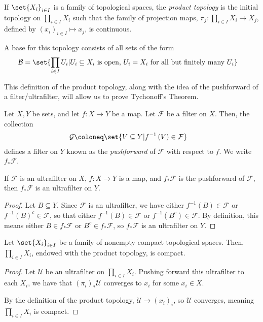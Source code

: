 \documentclass[10pt]{mypackage}
\begin{document}
\begin{definition}
  If $\set{X_i}_{i\in I}$ is a family of topological spaces, the \textit{product topology} is the initial topology on $\prod_{i\in I}X_i$ such that the family of projection maps, $\pi_j\colon \prod_{i\in I}X_i\rightarrow X_j$, defined by $\left( x_i \right)_{i\in I} \mapsto x_j$, is continuous.\newline

  A base for this topology consists of all sets of the form
  \begin{align*}
    \mathcal{B} &= \set{\prod_{i\in I}U_{i} | U_i\subseteq X_i\text{ is open, }U_i = X_i\text{ for all but finitely many }U_i}
  \end{align*}
\end{definition}
This definition of the product topology, along with the idea of the pushforward of a filter/ultrafilter, will allow us to prove Tychonoff's Theorem.
\begin{definition}
  Let $X,Y$ be sets, and let $f\colon X\rightarrow Y$ be a map. Let $\mathcal{F}$ be a filter on $X$. Then, the collection
  \begin{align*}
    \mathcal{G} &\coloneq \set{V\subseteq Y | f^{-1}\left( V \right) \in \mathcal{F}}
  \end{align*}
  defines a filter on $Y$ known as the \textit{pushforward} of $\mathcal{F}$ with respect to $f$. We write $f_{\ast}\mathcal{F}$.
\end{definition}
\begin{proposition}
  If $\mathcal{F}$ is an ultrafilter on $X$, $f\colon X\rightarrow Y$ is a map, and $f_{\ast}\mathcal{F}$ is the pushforward of $\mathcal{F}$, then $f_{\ast}\mathcal{F}$ is an ultrafilter on $Y$.
\end{proposition}
\begin{proof}
  Let $B\subseteq Y$. Since $\mathcal{F}$ is an ultrafilter, we have either $f^{-1}\left( B \right)\in \mathcal{F}$ or $f^{-1}\left( B \right)^{c}\in \mathcal{F}$, so that either $f^{-1}\left( B \right)\in \mathcal{F}$ or $f^{-1}\left( B^{c} \right)\in \mathcal{F}$. By definition, this means either $B\in f_{\ast}\mathcal{F}$ or $B^{c}\in f_{\ast}\mathcal{F}$, so $f_{\ast}\mathcal{F}$ is an ultrafilter on $Y$.
\end{proof}
\begin{theorem}
  Let $\set{X_i}_{i\in I}$ be a family of nonempty compact topological spaces. Then, $\prod_{i\in I}X_i$, endowed with the product topology, is compact.
\end{theorem}
\begin{proof}
  Let $\mathcal{U}$ be an ultrafilter on $\prod_{i\in I}X_i$. Pushing forward this ultrafilter to each $X_i$, we have that $\left( \pi_i \right)_{\ast}\mathcal{U}$ converges to $ x_i$ for some $x_i\in X$.\newline

  By the definition of the product topology, $\mathcal{U}\rightarrow \left( x_i \right)_{i}$, so $\mathcal{U}$ converges, meaning $\prod_{i\in I}X_i$ is compact.
\end{proof}
\end{document}
